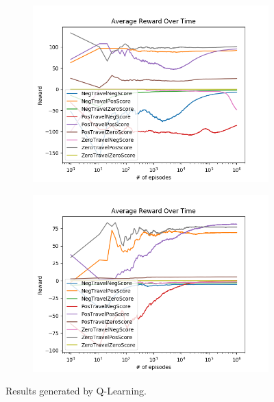 \documentclass[result.tex]{subfiles}
\begin{document}
\begin{figure}[ht]
        \begin{subfigure}[b]{.35\linewidth}
            \includegraphics[width=\linewidth]{../images/qlearning/reward/234/board_state_average_reward_over_time.png}
        \end{subfigure}
        \begin{subfigure}[b]{.35\linewidth}
            \includegraphics[width=\linewidth]{../images/qlearning/reward/234/directional_distance_state_average_reward_over_time.png}
        \end{subfigure}
        \caption{Results generated by Q-Learning.}
        \label{fig:reward_result_qlearning}
    \end{figure}
\end{document}
